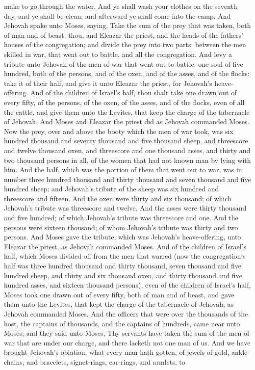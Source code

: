 make to go through the water. And ye shall wash your clothes on the seventh day, and ye shall be clean; and afterward ye shall come into the camp.  And Jehovah spake unto Moses, saying, Take the sum of the prey that was taken, both of man and of beast, thou, and Eleazar the priest, and the heads of the fathers’ houses of the congregation; and divide the prey into two parts: between the men skilled in war, that went out to battle, and all the congregation. And levy a tribute unto Jehovah of the men of war that went out to battle: one soul of five hundred, both of the persons, and of the oxen, and of the asses, and of the flocks: take it of their half, and give it unto Eleazar the priest, for Jehovah’s heave-offering. And of the children of Israel’s half, thou shalt take one drawn out of every fifty, of the persons, of the oxen, of the asses, and of the flocks, even of all the cattle, and give them unto the Levites, that keep the charge of the tabernacle of Jehovah. And Moses and Eleazar the priest did as Jehovah commanded Moses.  Now the prey, over and above the booty which the men of war took, was six hundred thousand and seventy thousand and five thousand sheep, and threescore and twelve thousand oxen, and threescore and one thousand asses, and thirty and two thousand persons in all, of the women that had not known man by lying with him. And the half, which was the portion of them that went out to war, was in number three hundred thousand and thirty thousand and seven thousand and five hundred sheep: and Jehovah’s tribute of the sheep was six hundred and threescore and fifteen. And the oxen were thirty and six thousand; of which Jehovah’s tribute was threescore and twelve. And the asses were thirty thousand and five hundred; of which Jehovah’s tribute was threescore and one. And the persons were sixteen thousand; of whom Jehovah’s tribute was thirty and two persons. And Moses gave the tribute, which was Jehovah’s heave-offering, unto Eleazar the priest, as Jehovah commanded Moses.  And of the children of Israel’s half, which Moses divided off from the men that warred (now the congregation’s half was three hundred thousand and thirty thousand, seven thousand and five hundred sheep, and thirty and six thousand oxen, and thirty thousand and five hundred asses, and sixteen thousand persons), even of the children of Israel’s half, Moses took one drawn out of every fifty, both of man and of beast, and gave them unto the Levites, that kept the charge of the tabernacle of Jehovah; as Jehovah commanded Moses.  And the officers that were over the thousands of the host, the captains of thousands, and the captains of hundreds, came near unto Moses; and they said unto Moses, Thy servants have taken the sum of the men of war that are under our charge, and there lacketh not one man of us. And we have brought Jehovah’s oblation, what every man hath gotten, of jewels of gold, ankle-chains, and bracelets, signet-rings, ear-rings, and armlets, to 
